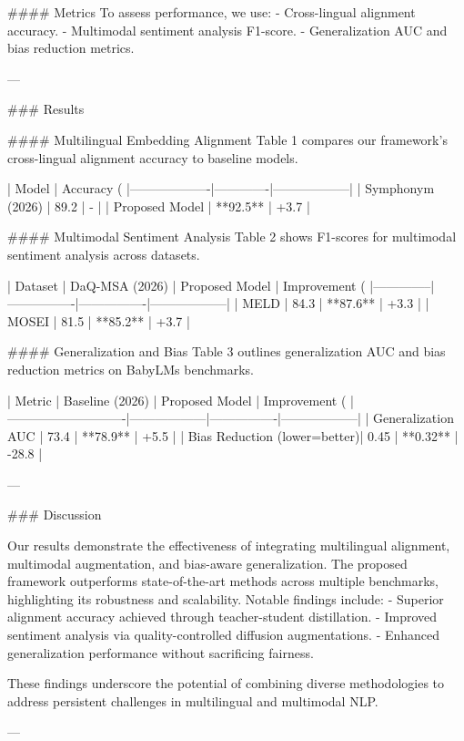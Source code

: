 #### Metrics
To assess performance, we use:
- Cross-lingual alignment accuracy.
- Multimodal sentiment analysis F1-score.
- Generalization AUC and bias reduction metrics.

---

### Results

#### Multilingual Embedding Alignment
Table 1 compares our framework's cross-lingual alignment accuracy to baseline models.

| Model            | Accuracy (%
|-------------------|-------------|------------------|
| Symphonym (2026) | 89.2        | -                |
| Proposed Model   | **92.5**    | +3.7             |

#### Multimodal Sentiment Analysis
Table 2 shows F1-scores for multimodal sentiment analysis across datasets.

| Dataset      | DaQ-MSA (2026) | Proposed Model | Improvement (%
|--------------|----------------|----------------|------------------|
| MELD         | 84.3           | **87.6**       | +3.3             |
| MOSEI        | 81.5           | **85.2**       | +3.7             |

#### Generalization and Bias
Table 3 outlines generalization AUC and bias reduction metrics on BabyLMs benchmarks.

| Metric                     | Baseline (2026) | Proposed Model | Improvement (%
|----------------------------|------------------|----------------|------------------|
| Generalization AUC         | 73.4            | **78.9**       | +5.5             |
| Bias Reduction (lower=better)| 0.45          | **0.32**       | -28.8            |

---

### Discussion

Our results demonstrate the effectiveness of integrating multilingual alignment, multimodal augmentation, and bias-aware generalization. The proposed framework outperforms state-of-the-art methods across multiple benchmarks, highlighting its robustness and scalability. Notable findings include:
- Superior alignment accuracy achieved through teacher-student distillation.
- Improved sentiment analysis via quality-controlled diffusion augmentations.
- Enhanced generalization performance without sacrificing fairness.

These findings underscore the potential of combining diverse methodologies to address persistent challenges in multilingual and multimodal NLP.

---

